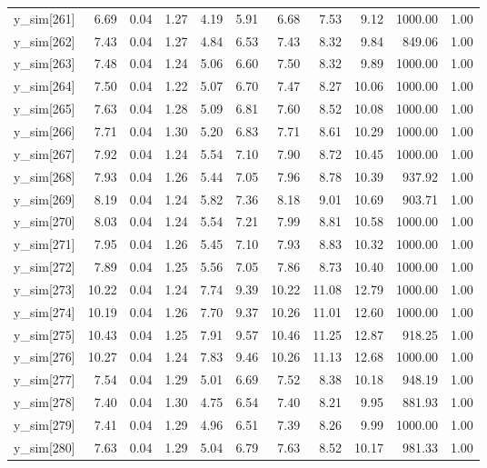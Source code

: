 \begin{table}[ht]
\begin{tabular}{rrrrrrrrrrr}
  y\_sim[261] & 6.69 & 0.04 & 1.27 & 4.19 & 5.91 & 6.68 & 7.53 & 9.12 & 1000.00 & 1.00 \\ 
  y\_sim[262] & 7.43 & 0.04 & 1.27 & 4.84 & 6.53 & 7.43 & 8.32 & 9.84 & 849.06 & 1.00 \\ 
  y\_sim[263] & 7.48 & 0.04 & 1.24 & 5.06 & 6.60 & 7.50 & 8.32 & 9.89 & 1000.00 & 1.00 \\ 
  y\_sim[264] & 7.50 & 0.04 & 1.22 & 5.07 & 6.70 & 7.47 & 8.27 & 10.06 & 1000.00 & 1.00 \\ 
  y\_sim[265] & 7.63 & 0.04 & 1.28 & 5.09 & 6.81 & 7.60 & 8.52 & 10.08 & 1000.00 & 1.00 \\ 
  y\_sim[266] & 7.71 & 0.04 & 1.30 & 5.20 & 6.83 & 7.71 & 8.61 & 10.29 & 1000.00 & 1.00 \\ 
  y\_sim[267] & 7.92 & 0.04 & 1.24 & 5.54 & 7.10 & 7.90 & 8.72 & 10.45 & 1000.00 & 1.00 \\ 
  y\_sim[268] & 7.93 & 0.04 & 1.26 & 5.44 & 7.05 & 7.96 & 8.78 & 10.39 & 937.92 & 1.00 \\ 
  y\_sim[269] & 8.19 & 0.04 & 1.24 & 5.82 & 7.36 & 8.18 & 9.01 & 10.69 & 903.71 & 1.00 \\ 
  y\_sim[270] & 8.03 & 0.04 & 1.24 & 5.54 & 7.21 & 7.99 & 8.81 & 10.58 & 1000.00 & 1.00 \\ 
  y\_sim[271] & 7.95 & 0.04 & 1.26 & 5.45 & 7.10 & 7.93 & 8.83 & 10.32 & 1000.00 & 1.00 \\ 
  y\_sim[272] & 7.89 & 0.04 & 1.25 & 5.56 & 7.05 & 7.86 & 8.73 & 10.40 & 1000.00 & 1.00 \\ 
  y\_sim[273] & 10.22 & 0.04 & 1.24 & 7.74 & 9.39 & 10.22 & 11.08 & 12.79 & 1000.00 & 1.00 \\ 
  y\_sim[274] & 10.19 & 0.04 & 1.26 & 7.70 & 9.37 & 10.26 & 11.01 & 12.60 & 1000.00 & 1.00 \\ 
  y\_sim[275] & 10.43 & 0.04 & 1.25 & 7.91 & 9.57 & 10.46 & 11.25 & 12.87 & 918.25 & 1.00 \\ 
  y\_sim[276] & 10.27 & 0.04 & 1.24 & 7.83 & 9.46 & 10.26 & 11.13 & 12.68 & 1000.00 & 1.00 \\ 
  y\_sim[277] & 7.54 & 0.04 & 1.29 & 5.01 & 6.69 & 7.52 & 8.38 & 10.18 & 948.19 & 1.00 \\ 
  y\_sim[278] & 7.40 & 0.04 & 1.30 & 4.75 & 6.54 & 7.40 & 8.21 & 9.95 & 881.93 & 1.00 \\ 
  y\_sim[279] & 7.41 & 0.04 & 1.29 & 4.96 & 6.51 & 7.39 & 8.26 & 9.99 & 1000.00 & 1.00 \\ 
  y\_sim[280] & 7.63 & 0.04 & 1.29 & 5.04 & 6.79 & 7.63 & 8.52 & 10.17 & 981.33 & 1.00 \\ 

\end{tabular}
\end{table}
